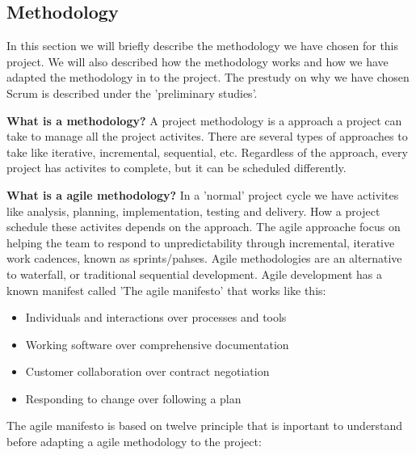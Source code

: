 \subsection{Methodology}

In this section we will briefly describe the methodology we have chosen 
for this project. We will also described how the methodology works and 
how we have adapted the methodology in to the project.
The prestudy on why we have chosen Scrum is described 
under the 'preliminary studies'. 

{\bf What is a methodology? } A project methodology is a approach a project can take to manage all the project activites. There are several types of approaches to take like iterative, incremental, sequential, etc. Regardless of the approach, every project has activites to complete, but it can be scheduled differently. 

{\bf What is a agile methodology? } In a 'normal' project cycle we have activites like analysis, planning, implementation, testing and delivery. How a project schedule these activites depends on the approach. 
The agile approache focus on helping the team to respond to unpredictability through incremental, iterative work cadences, known as sprints/pahses. Agile methodologies are an alternative to waterfall, or traditional sequential development.
Agile development has a known manifest called 'The agile manifesto' that works like this:

\begin{itemize}
	\item Individuals and interactions over processes and tools
    \item Working software over comprehensive documentation
    \item Customer collaboration over contract negotiation
    \item Responding to change over following a plan 
\end{itemize}

The agile manifesto is based on twelve principle that is inportant to understand before
adapting a agile methodology to the project:

